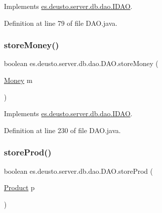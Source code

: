 Implements \hyperlink{interfacees_1_1deusto_1_1server_1_1db_1_1dao_1_1_i_d_a_o_a19f9b0d0b6f5f80730d6d197deca7dfc}{es.\+deusto.\+server.\+db.\+dao.\+I\+D\+AO}.



Definition at line 79 of file D\+A\+O.\+java.

\mbox{\label{classes_1_1deusto_1_1server_1_1db_1_1dao_1_1_d_a_o_a0cfb218b648ebc99aed950614173b6c6}} 
\subsubsection{\texorpdfstring{store\+Money()}{storeMoney()}}
{\footnotesize\ttfamily boolean es.\+deusto.\+server.\+db.\+dao.\+D\+A\+O.\+store\+Money (\begin{DoxyParamCaption}\item[{\hyperlink{classes_1_1deusto_1_1server_1_1db_1_1data_1_1_money}{Money}}]{m }\end{DoxyParamCaption})}



Implements \hyperlink{interfacees_1_1deusto_1_1server_1_1db_1_1dao_1_1_i_d_a_o_a0c952a7cac366a448451d8150a8d57e4}{es.\+deusto.\+server.\+db.\+dao.\+I\+D\+AO}.



Definition at line 230 of file D\+A\+O.\+java.

\mbox{\label{classes_1_1deusto_1_1server_1_1db_1_1dao_1_1_d_a_o_a345f30d95426e1cc8bd845949978dd1c}} 
\subsubsection{\texorpdfstring{store\+Prod()}{storeProd()}}
{\footnotesize\ttfamily boolean es.\+deusto.\+server.\+db.\+dao.\+D\+A\+O.\+store\+Prod (\begin{DoxyParamCaption}\item[{\hyperlink{classes_1_1deusto_1_1server_1_1db_1_1data_1_1_product}{Product}}]{p }\end{DoxyParamCaption})}



